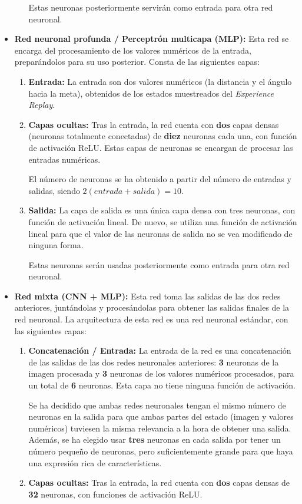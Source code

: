 \begin{itemize}
\begin{enumerate}
	Estas neuronas posteriormente servirán como entrada para otra red neuronal.
\end{enumerate}

\item \textbf{Red neuronal profunda / Perceptrón multicapa (MLP):} Esta red se encarga del procesamiento de los valores numéricos de la entrada, preparándolos para su uso posterior. Consta de las siguientes capas:

\begin{enumerate}
\item \textbf{Entrada:} La entrada son dos valores numéricos (la distancia y el ángulo hacia la meta), obtenidos de los estados muestreados del \textit{Experience Replay}.
\item \textbf{Capas ocultas:} Tras la entrada, la red cuenta con \textbf{dos} capas densas (neuronas totalmente conectadas) de \textbf{diez} neuronas cada una, con función de activación ReLU. Estas capas de neuronas se encargan de procesar las entradas numéricas.

El número de neuronas se ha obtenido a partir del número de entradas y salidas, siendo $2(entrada + salida) = 10$.
\item \textbf{Salida:} La capa de salida es una única capa densa con tres neuronas, con función de activación lineal. De nuevo, se utiliza una función de activación lineal para que el valor de las neuronas de salida no se vea modificado de ninguna forma.

Estas neuronas serán usadas posteriormente como entrada para otra red neuronal.
\end{enumerate}

\item \textbf{Red mixta (CNN + MLP):} Esta red toma las salidas de las dos redes anteriores, juntándolas y procesándolas para obtener las salidas finales de la red neuronal. La arquitectura de esta red es una red neuronal estándar, con las siguientes capas:
\begin{enumerate}
\item \textbf{Concatenación / Entrada:} La entrada de la red es una concatenación de las salidas de las dos redes neuronales anteriores: \textbf{3} neuronas de la imagen procesada y \textbf{3} neuronas de los valores numéricos procesados, para un total de \textbf{6} neuronas. Esta capa no tiene ninguna función de activación.

Se ha decidido que ambas redes neuronales tengan el mismo número de neuronas en la salida para que ambas partes del estado (imagen y valores numéricos) tuviesen la misma relevancia a la hora de obtener una salida. Además, se ha elegido usar \textbf{tres} neuronas en cada salida por tener un número pequeño de neuronas, pero suficientemente grande para que haya una expresión rica de características.
\item \textbf{Capas ocultas:} Tras la entrada, la red cuenta con \textbf{dos} capas densas de \textbf{32} neuronas, con funciones de activación ReLU.


\end{enumerate}
\end{itemize}

